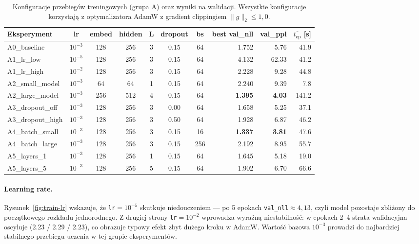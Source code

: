 \documentclass[12pt,a4paper]{article}
\begin{document}
\begin{table}[H]
\centering
\caption{Konfiguracje przebiegów treningowych (grupa A) oraz wyniki na walidacji. Wszystkie konfiguracje korzystają z optymalizatora AdamW z gradient clippingiem $\|g\|_2\le 1{,}0$.}
\label{tab:exp-train}
\small
\begin{tabular}{lccccccrrr}
\toprule
Eksperyment & lr & embed & hidden & L & dropout & bs & best val\_nll & val\_ppl & $\overline{t_{\text{ep}}}$ [s] \\
\midrule
A0\_baseline       & $10^{-3}$ & 128 & 256 & 3 & 0.15 & 64  & 1.752 & 5.76  & 41.9 \\
A1\_lr\_low        & $10^{-5}$ & 128 & 256 & 3 & 0.15 & 64  & 4.132 & 62.33 & 41.2 \\
A1\_lr\_high       & $10^{-2}$ & 128 & 256 & 3 & 0.15 & 64  & 2.228 & 9.28  & 44.8 \\
A2\_small\_model   & $10^{-3}$ & 64  & 64  & 1 & 0.15 & 64  & 2.240 & 9.39  & 7.8  \\
A2\_large\_model   & $10^{-3}$ & 256 & 512 & 4 & 0.15 & 64  & \textbf{1.395} & \textbf{4.03}  & 141.2 \\
A3\_dropout\_off   & $10^{-3}$ & 128 & 256 & 3 & 0.00 & 64  & 1.658 & 5.25  & 37.1 \\
A3\_dropout\_high  & $10^{-3}$ & 128 & 256 & 3 & 0.50 & 64  & 1.928 & 6.87  & 46.2 \\
A4\_batch\_small   & $10^{-3}$ & 128 & 256 & 3 & 0.15 & 16  & \textbf{1.337} & \textbf{3.81}  & 47.6 \\
A4\_batch\_large   & $10^{-3}$ & 128 & 256 & 3 & 0.15 & 256 & 2.192 & 8.95  & 55.7 \\
A5\_layers\_1      & $10^{-3}$ & 128 & 256 & 1 & 0.15 & 64  & 1.645 & 5.18  & 19.0 \\
A5\_layers\_5      & $10^{-3}$ & 128 & 256 & 5 & 0.15 & 64  & 1.902 & 6.70  & 66.6 \\
\bottomrule
\end{tabular}
\end{table}

\paragraph{Learning rate.}
Rysunek~\ref{fig:train-lr} wskazuje, że \texttt{lr}$=10^{-5}$ skutkuje niedouczeniem --- po 5 epokach \texttt{val\_nll}$\approx 4{,}13$, czyli model pozostaje zbliżony do początkowego rozkładu jednorodnego. Z drugiej strony \texttt{lr}$=10^{-2}$ wprowadza wyraźną niestabilność: w epokach 2--4 strata walidacyjna oscyluje (2.23 / 2.29 / 2.23), co obrazuje typowy efekt zbyt dużego kroku w AdamW. Wartość bazowa $10^{-3}$ prowadzi do najbardziej stabilnego przebiegu uczenia w tej grupie eksperymentów.
\end{document}
